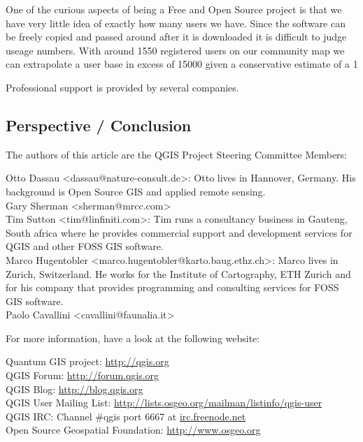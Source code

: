 One of the curious aspects of being a Free and Open Source project is that we 
have very little idea of exactly how many users we have. Since the software can 
be freely copied and passed around after it is downloaded it is difficult to 
judge useage numbers. With around 1550 registered users on our community map 
we can extrapolate a user base in excess of 15000 given a conservative 
estimate of a 1%

Professional support is provided by several companies.

\subsection{Perspective / Conclusion}


The authors of this article are the QGIS Project Steering Committee Members:

Otto Dassau <dassau@nature-consult.de>: Otto lives in Hannover, Germany. His
background is Open Source GIS and applied remote sensing. 
\\Gary Sherman <sherman@mrcc.com>
\\Tim Sutton <tim@linfiniti.com>: Tim runs a consultancy business in Gauteng,
South africa where he provides commercial support and development services for
QGIS and other FOSS GIS software.
\\Marco Hugentobler <marco.hugentobler@karto.baug.ethz.ch>: Marco lives in Zurich, Switzerland. He works for the Institute of Cartography, ETH Zurich and for his company that provides programming and consulting services for FOSS GIS software.
\\Paolo Cavallini <cavallini@faunalia.it>


For more information, have a look at the following website:

Quantum GIS project: \url{http://qgis.org}
\\QGIS Forum: \url{http://forum.qgis.org}
\\QGIS Blog: \url{http://blog.qgis.org}
\\QGIS User Mailing List:
\url{http://lists.osgeo.org/mailman/listinfo/qgis-user}
\\QGIS IRC: Channel \#qgis port 6667 at \url{irc.freenode.net}
\\Open Source Geospatial Foundation: \url{http://www.osgeo.org}



